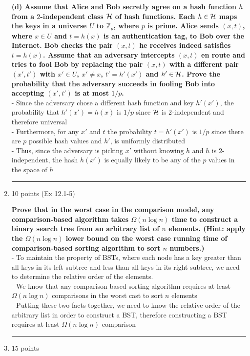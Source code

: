 \documentclass[letterpaper,12pt]{article}
\begin{document}
\begin{enumerate}
\textbf{(d) Assume that Alice and Bob secretly agree on a hash function $h$ from a
$2$-independent class ${\cal H}$ of hash functions. Each $h\in {\cal H}$ maps the
keys in a universe $U$ to $\mathbb{Z}_p$, where $p$ is prime. Alice sends $(x,t)$,
where $x\in U$ and $t=h(x)$ is an authentication tag, to Bob over the Internet. 
Bob checks the pair $(x,t)$ he receives indeed satisfies $t=h(x)$. Assume that an 
adversary intercepts $(x,t)$ en route and tries to fool Bob by replacing the pair 
$(x,t)$ with a different pair $(x',t')$ with $x'\in U$, $x'\neq x$, $t'=h'(x')$ and 
$h'\in {\cal H}$. Prove the probability that the adversary succeeds in fooling Bob 
into accepting $(x',t')$ is at most $1/p$.} \\
- Since the adversary chose a different hash function and key $h'(x')$, the probability that $h'(x') = h(x)$ is $1/p$ since ${\cal H}$ is 2-independent and therefore universal \\
- Furthermore, for any $x'$ and $t$ the probability $t=h'(x')$ is $1/p$ since there are $p$ possible hash values and $h'$, is uniformly distributed \\
- Thus, since the adversary is picking $x'$ without knowing $h$ and $h$ is 2-independent, the hash $h(x')$ is equally likely to be any of the $p$ values in the space of $h$ 

\noindent\rule{16cm}{0.1pt}
\item 10 points (Ex 12.1-5)  

\textbf{Prove that in the worst case in the comparison model, any comparison-based algorithm
takes $\Omega(n\log n)$ time to construct a binary search tree from an arbitrary list
of $n$ elements. (Hint: apply the $\Omega(n\log n)$ lower bound on the worst case
running time of comparison-based sorting algorithm to sort $n$ numbers.)} \\
- To maintain the property of BSTs, where each node has a key greater than all keys in its left subtree and less than all keys in its right subtree, we need to determine the relative order of the elements. \\
- We know that any comparison-based sorting algorithm requires at least $\Omega(n\log n)$ comparisons in the worst cast to sort $n$ elements \\
- Putting these two facts together, we need to know the relative order of the arbitrary list in order to construct a BST, therefore constructing a BST requires at least $\Omega(n\log n)$ comparison

\noindent\rule{16cm}{0.1pt}
\item 15 points 


\end{enumerate}
\end{document}
